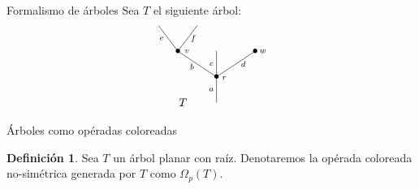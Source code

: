\documentclass[12pt,aspectratio=169]{beamer}
\numberwithin{equation}{section}
\theoremstyle{definition}
\newtheorem{defi}[teo]{Definici\'on}
\begin{document}
\begin{frame}{Formalismo de \'arboles}
    Sea $T$ el siguiente \'arbol:
\begin{equation}
    \xy
    <0.08cm, 0cm>:
    (0.0, 0.0)*{}="1"; %
    (0.0, 10.0)*=0{\bullet}="2"; %
    (-15.0, 20.0)*=0{\bullet}="3"; %
    (-22.5, 30.0)*{}="4"; %
    (-7.5, 30.0)*{}="5"; %
    (0.0, 20.0)*{}="6"; %
    (15.0, 20.0)*=0{\bullet}="7"; %
    "1";"2" **\dir{-};
    "2";"3" **\dir{-};
    "3";"4" **\dir{-};
    "3";"5" **\dir{-};
    "2";"6" **\dir{-};
    "2";"7" **\dir{-};
    (3.0, 9.5)*=0{\scriptstyle r};
    (-11.5, 20.0)*=0{\scriptstyle v};
    (-2.0, 5.0)*=0{\scriptstyle a};
    (-9.5, 14.0)*=0{\scriptstyle b};
    (-21.3, 25.0)*=0{\scriptstyle e};
    (-9, 25.0)*=0{\scriptstyle f};
    (-2.0, 15.0)*=0{\scriptstyle c};
    (10.4, 15.0)*=0{\scriptstyle d};
    (18.0, 20.0)*=0{\scriptstyle w};
    (-13,0)*{T};
    \endxy
\end{equation}

\end{frame}
\begin{frame}{\'Arboles como op\'eradas coloreadas}
    \begin{defi}
        Sea $T$ un \'arbol planar con ra\'iz. Denotaremos la op\'erada coloreada no-sim\'etrica generada por $T$ como $\Omega_p(T)$. 
    \end{defi}
\end{frame}
\end{document}
